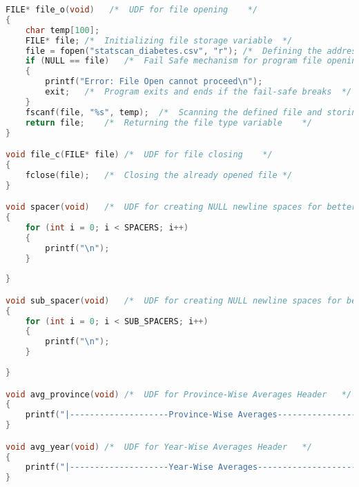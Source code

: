 \begin{lstlisting}[language=C, caption=\textit{CPS 188 Term Project Source Code}]
FILE* file_o(void)   /*  UDF for file opening    */
{
    char temp[100];
    FILE* file; /*  Initializing file storage variable  */
    file = fopen("statscan_diabetes.csv", "r"); /*  Defining the address path of file to be opened and read    */
    if (NULL == file)   /*  Fail Safe mechanism for program file opening    */
    {
        printf("Error: File Open cannot proceed\n");
        exit;   /*  Program exits and ends if the fail-safe breaks  */
    }
    fscanf(file, "%s", temp);  /*  Scanning the defined file and storing it at address of Var(temp)    */
    return file;    /*  Returning the file type variable    */
}

void file_c(FILE* file) /*  UDF for file closing    */
{
    fclose(file);   /*  Closing the already opened file */
}

void spacer(void)	/*	UDF for creating NULL newline spaces for better tabular and visual output	*/
{
    for (int i = 0; i < SPACERS; i++)
    {
        printf("\n");
    }
    
}

void sub_spacer(void)	/*	UDF for creating NULL newline spaces for better tabular and visual output	*/
{
    for (int i = 0; i < SUB_SPACERS; i++)
    {
        printf("\n");
    }
    
}

void avg_province(void)	/*	UDF for Province-Wise Averages Header	*/
{
	printf("|--------------------Province-Wise Averages--------------------|\n");
}

void avg_year(void)	/*	UDF for Year-Wise Averages Header	*/
{
	printf("|--------------------Year-Wise Averages--------------------|\n");
}


\end{lstlisting}
